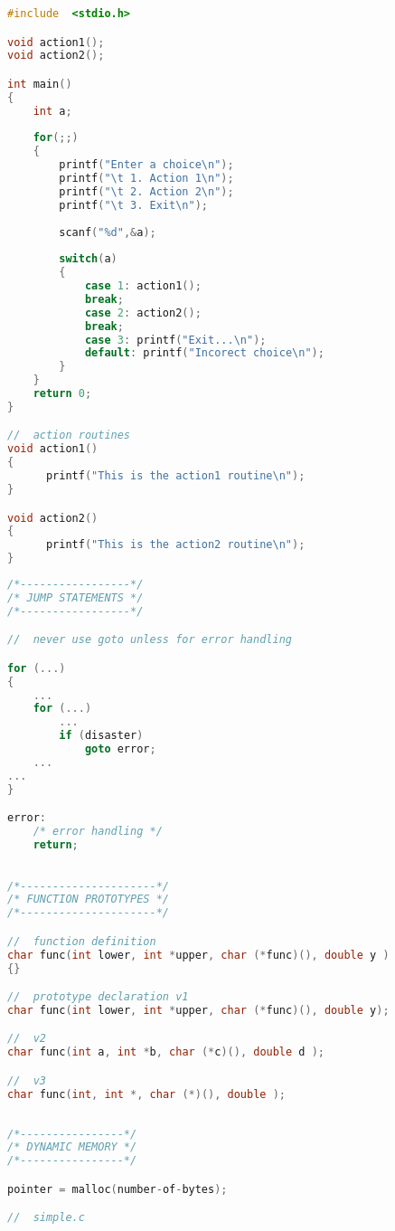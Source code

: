 \documentclass[8pt]{extarticle}
\begin{document}
\begin{small}
\begin{multicols}{2}
\begin{lstlisting}[language=C]
#include  <stdio.h>

void action1();
void action2();

int main() 
{
	int a;
	
	for(;;)
    {
    	printf("Enter a choice\n");
        printf("\t 1. Action 1\n");
        printf("\t 2. Action 2\n");
        printf("\t 3. Exit\n");
        
        scanf("%d",&a);
        
		switch(a)
		{
			case 1: action1();
			break;
			case 2: action2();
			break;
			case 3: printf("Exit...\n");
			default: printf("Incorect choice\n");
		}
	}
	return 0;
}

//  action routines
void action1()
{
      printf("This is the action1 routine\n");
}

void action2()
{
      printf("This is the action2 routine\n");
}
\end{lstlisting}

\begin{lstlisting}[language=C]
/*-----------------*/
/* JUMP STATEMENTS */
/*-----------------*/

//  never use goto unless for error handling

for (...)
{
	...
	for (...)
    	...
        if (disaster)
        	goto error;
	...
...
}

error:
	/* error handling */
	return;
\end{lstlisting}

\begin{lstlisting}[language=C]

/*---------------------*/
/* FUNCTION PROTOTYPES */
/*---------------------*/

//  function definition
char func(int lower, int *upper, char (*func)(), double y )
{}

//  prototype declaration v1
char func(int lower, int *upper, char (*func)(), double y);

//  v2
char func(int a, int *b, char (*c)(), double d );

//  v3
char func(int, int *, char (*)(), double );
	
\end{lstlisting}

\begin{lstlisting}[language=C]
/*----------------*/
/* DYNAMIC MEMORY */
/*----------------*/

pointer = malloc(number-of-bytes);

//  simple.c




\end{lstlisting}
\end{multicols}
\end{small}
\end{document}
